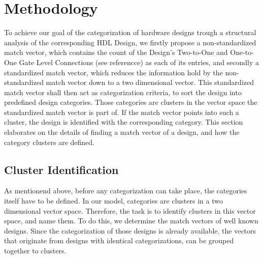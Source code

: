 
\section{Methodology}

To achieve our goal of the categorization of hardware designs trough a structural analysis of the corresponding HDL Design, we firstly propose a non-standardized match vector, which contains the count of the Design's Two-to-One and One-to-One Gate Level Connections (see \label{logicGates} referencce) as each of its entries, and secondly a standardized match vector, which reduces the information hold by the non-standardized match vector down to a two dimensional vector. This standardized match vector shall then act as categorization criteria, to sort the design into predefined design categories. Those categories are clusters in the vector space the standardized match vector is part of. If the match vector points into such a cluster, the design is identified with the corresponding category.
This section elaborates on the details of finding a match vector of a design, and
how the category clusters are defined. 

\subsection{Cluster Identification}
As mentionend above, before any categorization can take place, the categories itself
have to be defined. In our model, categories are clusters in a two dimensional vector space. 
Therefore, the task is to identify clusters in this vector space, and name them. 
To do this, we determine the match vectors of well known designs. Since
the categorization of those designs is already available, the vectors that originate from designs with identical categorizations, can be grouped together to clusters. 

